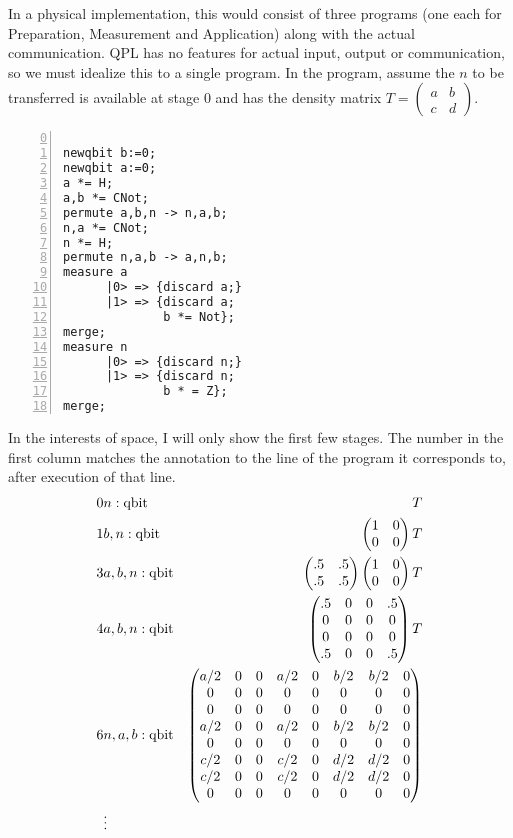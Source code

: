 In a physical implementation, this would consist of three programs (one each for Preparation,
Measurement and Application) along with the actual communication. QPL has no features for actual
input, output or communication, so we must idealize this to a single program. In the program,
assume the \qbit $n$ to be transferred is available at stage $0$ and has the density matrix $T
=\begin{pmatrix}a&b\\c&d\end{pmatrix}$.

\begin{Verbatim}[numbers=left,numbersep=6pt,firstnumber=0]

newqbit b:=0;
newqbit a:=0;
a *= H;
a,b *= CNot;
permute a,b,n -> n,a,b;
n,a *= CNot;
n *= H;
permute n,a,b -> a,n,b;
measure a
      |0> => {discard a;}
      |1> => {discard a;
              b *= Not};
merge;
measure n
      |0> => {discard n;}
      |1> => {discard n;
              b * = Z};
merge;
\end{Verbatim}
In the interests of space, I will only show the first few stages. The number in the first column
matches the annotation to the line of the program it corresponds to, after execution of that line.
\begin{eqnarray*}
  0 & n:\text{qbit} & T\\
  1 & b,n:\text{qbit} & \begin{pmatrix}1&0\\0&0\end{pmatrix} \*T\\
  3 & a,b,n:\text{qbit} & \begin{pmatrix}.5&.5\\.5&.5\end{pmatrix} \*
    \begin{pmatrix}1&0\\0&0\end{pmatrix} \* T\\
  4 & a,b,n:\text{qbit} & \begin{pmatrix}.5&0&0&.5\\0&0&0&0\\0&0&0&0\\.5&0&0&.5\end{pmatrix} \* T\\
  6 & n,a,b:\text{qbit} &
    \begin{pmatrix}a/2&0&0&a/2&0&b/2&b/2&0\\0&0&0&0&0&0&0&0\\0&0&0&0&0&0&0&0\\
        a/2&0&0&a/2&0&b/2&b/2&0\\0&0&0&0&0&0&0&0\\c/2&0&0&c/2&0&d/2&d/2&0\\
          c/2&0&0&c/2&0&d/2&d/2&0\\0&0&0&0&0&0&0&0\end{pmatrix}\\
  & \vdots &
\end{eqnarray*}
